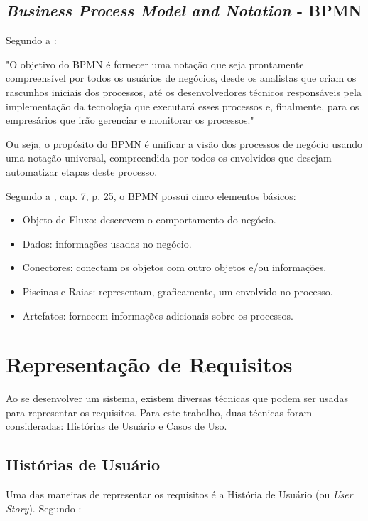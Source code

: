 \subsection{\textit{Business Process Model and Notation} - BPMN}
Segundo a \citeauthor{bpmn2013}: 

\begin{citacaoLonga}
"O objetivo do BPMN é fornecer uma notação que seja prontamente compreensível por todos os usuários de negócios, desde os analistas que criam os rascunhos iniciais dos processos, até os desenvolvedores técnicos responsáveis pela implementação da tecnologia que executará esses processos e, finalmente, para os empresários que irão gerenciar e monitorar os processos."
\end{citacaoLonga}

Ou seja, o propósito do BPMN é unificar a visão dos processos de negócio usando uma notação universal, compreendida por todos os envolvidos que desejam automatizar etapas deste processo.

Segundo a \citeauthor{bpmn2013}, cap. 7, p. 25, o BPMN possui cinco elementos básicos:

\begin{itemize}
    \item Objeto de Fluxo: descrevem o comportamento do negócio.
    \item Dados: informações usadas no negócio.
    \item Conectores: conectam os objetos com outro objetos e/ou informações.
    \item Piscinas e Raias: representam, graficamente, um envolvido no processo.
    \item Artefatos: fornecem informações adicionais sobre os processos.
\end{itemize}

\section{Representação de Requisitos}
Ao se desenvolver um sistema, existem diversas técnicas que podem ser usadas para representar os requisitos. Para este trabalho, duas técnicas foram consideradas: Histórias de Usuário e Casos de Uso.

\subsection{Histórias de Usuário}
Uma das maneiras de representar os requisitos é a História de Usuário (ou \textit{User Story}). Segundo \citeauthor{jonathanrasmusson}:

